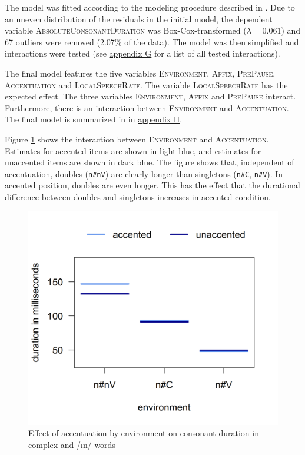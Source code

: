  The model was fitted according to the modeling procedure described in . Due to an uneven distribution of the residuals in the initial model, the dependent variable \textsc{AbsoluteConsonantDuration} was Box-Cox-transformed ($\lambda = 0.061$) and 67 outliers were removed (2.07\% of the data).
The model was then simplified and interactions were tested (see \hyperref[Appendix G Summaries of tested interactions in experimental study]{appendix G} for a list of all tested interactions).


The final model features the five variables \textsc{Environment}, \textsc{Affix}, \textsc{PrePause}, \textsc{Accentuation} and \textsc{LocalSpeechRate}. The variable \textsc{LocalSpeechRate} has the expected effect. The three variables \textsc{Environment}, \textsc{Affix} and \textsc{PrePause} interact. Furthermore, there is an interaction between \textsc{Environment} and \textsc{Accentuation}. The final model is summarized in  in \hyperref[Appendix H: Model Summaries Experiment]{appendix H}.


Figure \ref{fig: Un In experiment Env and accent} shows the interaction between \textsc{Environment} and \textsc{Accentuation}. Estimates for accented items are shown in light blue, and estimates  for unaccented items are shown in dark blue. The figure shows that, independent of accentuation, doubles (\texttt{n\#nV}) are clearly longer than singletons (\texttt{n\#C}, \texttt{n\#V}). In accented position, doubles are even longer. This has the effect that the durational difference between doubles and singletons increases in accented condition.



\begin{figure} [h!]
	\centering
	\includegraphics [scale=0.5] {images/Experiment/UnInInterEnvAcc}
	\caption{Effect of accentuation by environment on consonant duration in complex  and /ɪn/-words}
	\label{fig: Un In experiment Env and accent}
\end{figure}

